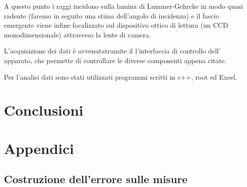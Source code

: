 \documentclass{article}
\begin{document}
A questo punto i raggi incidono sulla lamina di Lummer-Gehrcke in modo quasi
radente (faremo in seguito una stima dell'angolo di incidenza) e il fascio 
emergente viene infine focalizzato sul dispositivo ottico di lettura (un CCD
monodimensionale) attraverso la lente di camera.


L'acquisizione dei dati è avvenutatramite il l'interfaccia di controllo dell'
apparato, che permette di controllare le diverse componenti appena citate.

Per l'analisi dati sono stati utilizzati programmi scritti in c++, root ed Excel.


\section{Conclusioni}



\newpage
\appendix
\section{Appendici}
\label{appendice}
\subsection{Costruzione dell'errore sulle misure}
\label{Calcerr}
\end{document}
